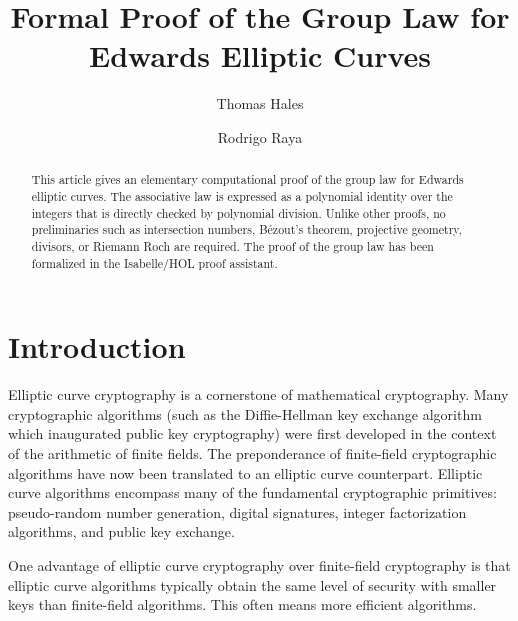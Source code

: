 \documentclass{llncs}
\title{Formal Proof of the Group Law for Edwards Elliptic Curves}
\author{Thomas Hales\inst{1}\and Rodrigo Raya\inst{2}}
\date{}
\institute{University of Pittsburgh\and Technical University of Munich}
\begin{document}
\maketitle

\begin{abstract} 
  This article gives an elementary computational proof of the group
  law for Edwards elliptic curves. The associative law is expressed as
  a polynomial identity over the integers that is directly checked by
  polynomial division.  Unlike other proofs, no preliminaries such as
  intersection numbers, B\'ezout's theorem, projective geometry,
  divisors, or Riemann Roch are required.  The proof of the group law
  has been formalized in the Isabelle/HOL proof assistant.
\end{abstract}


\newenvironment{blockquote}{%
  \par%
  \medskip%
  \baselineskip=0.7\baselineskip%
  \leftskip=2em\rightskip=2em%
  \noindent\ignorespaces}{%
  \par\medskip}


\section{Introduction}

Elliptic curve cryptography is a cornerstone of mathematical
cryptography.  Many cryptographic algorithms (such as the
Diffie-Hellman key exchange algorithm which inaugurated public key
cryptography) were first developed in the context of the arithmetic of
finite fields.  The preponderance of finite-field cryptographic
algorithms have now been translated to an elliptic curve counterpart.
Elliptic curve algorithms encompass many of the fundamental
cryptographic primitives: pseudo-random number generation, digital
signatures, integer factorization algorithms, and public key exchange.

One advantage of elliptic curve cryptography over finite-field
cryptography is that elliptic curve algorithms typically obtain the same
level of security with smaller keys than finite-field algorithms.
This often means more efficient algorithms.
\end{document}
